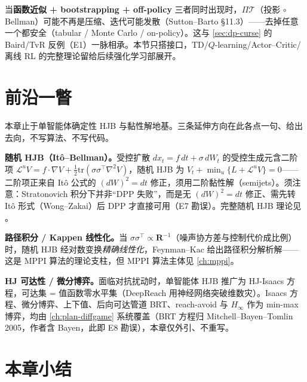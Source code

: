 \begin{tcolorbox}[colback=second!4,colframe=second!55!black,title=接口提示：致命三角与深入去向]
当\textbf{函数近似 + bootstrapping + off-policy} 三者同时出现时，$\Pi\mathcal T$（投影 $\circ$ Bellman）可能不再是压缩、迭代可能发散（Sutton--Barto §11.3\cite{sutton2018rl}）——去掉任意一个都安全（tabular / Monte Carlo / on-policy）。这与 \cref{sec:dp-curse} 的 Baird/TvR 反例（E1）一脉相承。本节只搭接口，TD/$Q$-learning/Actor--Critic/离线 RL 的完整理论留给后续强化学习部展开。
\end{tcolorbox}

\section{前沿一瞥}
\label{sec:dp-frontier}

本章止于单智能体确定性 HJB 与黏性解地基。三条延伸方向在此各点一句、给出去向，不写算法、不写代码。

\textbf{随机 HJB（Itô--Bellman）。}受控扩散 $dx_t=f\,dt+\sigma\,dW_t$ 的受控生成元含二阶项 $\mathcal L^uV=f\cdot\nabla V+\tfrac12\mathrm{tr}(\sigma\sigma^\top\nabla^2V)$，随机 HJB 为 $V_t+\min_u\{L+\mathcal L^uV\}=0$——二阶项正来自 Itô 公式的 $(dW)^2=dt$ 修正，须用二阶黏性解（semijets）。须注意：Stratonovich 积分下并非“DPP 失败”，而是无 $(dW)^2=dt$ 修正、需先转 Itô 形式（Wong--Zakai）后 DPP 才直接可用（E7 勘误）。完整随机 HJB 理论见 \cite{flemingsoner2006}。

\textbf{路径积分 / Kappen 线性化。}当 $\sigma\sigma^\top\propto \mathbf R^{-1}$（噪声协方差与控制代价成比例）时，随机 HJB 经对数变换\emph{精确线性化}，Feynman--Kac 给出路径积分解析解\cite{kappen2005linear,kappen2005path}——这是 MPPI 算法的理论支柱，但 MPPI 算法主体见 \cref{ch:mppi}。

\textbf{HJ 可达性 / 微分博弈。}面临对抗扰动时，单智能体 HJB 推广为 HJ-Isaacs 方程，可达集 = 值函数零水平集（DeepReach 用神经网络突破维数灾\cite{bansal2021deepreach}）。Isaacs 方程、微分博弈、上下值、后向可达管道 BRT、reach-avoid 与 $H_\infty$ 作为 min-max 博弈，均由 \cref{ch:plan-diffgame} 系统覆盖（BRT 方程归 Mitchell--Bayen--Tomlin 2005，作者含 Bayen，此即 E8 勘误\cite{mitchell2005time}），本章仅外引、不重写。

\section*{本章小结}

